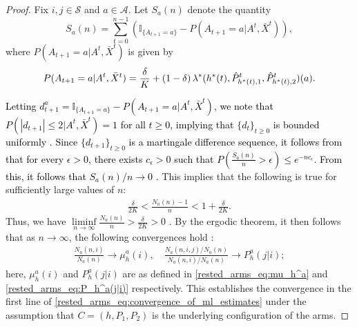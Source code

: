 \begin{proof}
Fix $i,j\in\mathcal{S}$ and $a\in\mathcal{A}$. Let $S_a(n)$ denote the quantity
\begin{equation}
	S_a(n)=\sum\limits_{t=0}^{n-1}\left(\mathbb{I}_{\{A_{t+1}=a\}}-P(A_{t+1}=a|A^t,\bar{X}^t)\right),\label{rested_arms_eq:S_a(n)}
\end{equation}	
where $P(A_{t+1}=a|A^t,\bar{X}^t)$ is given by
	\begingroup\allowdisplaybreaks\begin{align}
	P(A_{t+1}=a|A^t,\bar{X}^t)
	=\frac{\delta}{K}+(1-\delta)\,\lambda^*(h^*(t),\hat{P}^t_{h^*(t),1},\hat{P}^t_{h^*(t),2})(a).\label{rested_arms_eq:P(A_{n+1}=a|Z^n,A^n)}
\end{align}\endgroup

\textcolor{black}{Letting $d^a_{t+1}=\mathbb{I}_{\{A_{t+1}=a\}}-P(A_{t+1}=a|A^t,\bar{X}^t)$, we note that $P(|d_{t+1}|\leq 2|A^t,\bar{X}^t)=1$ for all $t\geq 0$, implying that $\{d_{t}\}_{t\geq 0}$ is bounded uniformly . Since $\{d_{t+1}\}_{t\geq 0}$ is a martingale difference sequence, it follows from \cite[Th. 1.2A]{Victor1999} that for every $\epsilon>0$, there exists $c_\epsilon>0$ such that $P(\frac{S_a(n)}{n}>\epsilon)\leq e^{-nc_\epsilon}$. From this, it follows that $S_a(n)/n\to 0$ .} This implies that the following is true  for sufficiently large values of $n$:
\begingroup\allowdisplaybreaks\begin{align}
	\frac{\delta}{2K}<\frac{N_a(n)-1}{n}<1+\frac{\delta}{2K}.\label{rested_arms_eq:N_a(n)_lies_between_two_quantities}
\end{align}\endgroup
Thus, we have $\liminf\limits_{n\to\infty}\frac{N_a(n)}{n}>\frac{\delta}{2K}>0$ . By the ergodic theorem, it then follows that as $n\to\infty$, the following convergences hold :
\begingroup\allowdisplaybreaks\begin{align}
    \frac{N_a(n,i)}{N_a(n)}\longrightarrow \mu_h^a(i),\quad
	\frac{N_a(n,i,j)/N_a(n)}{N_a(n,i)/N_a(n)}\longrightarrow P_h^a(j|i)\label{rested_arms_eq:first_part_convergence};
\end{align}\endgroup
here, $\mu_h^a(i)$ and $P_h^a(j|i)$ are as defined in \eqref{rested_arms_eq:mu_h^a} and \eqref{rested_arms_eq:P_h^a(j|i)} respectively.
This establishes the convergence in the first line of \eqref{rested_arms_eq:convergence_of_ml_estimates} under the assumption that $C=(h,P_1,P_2)$ is the underlying configuration of the arms.


\end{proof}
